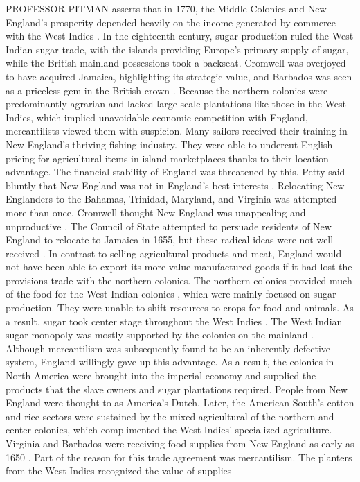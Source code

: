 PROFESSOR PITMAN asserts that in 1770, the Middle Colonies and New England's prosperity depended heavily on the income generated by commerce with the West Indies . In the eighteenth century, sugar production ruled the West Indian sugar trade, with the islands providing Europe's primary supply of sugar, while the British mainland possessions took a backseat. Cromwell was overjoyed to have acquired Jamaica, highlighting its strategic value, and Barbados was seen as a priceless gem in the British crown . Because the northern colonies were predominantly agrarian and lacked large-scale plantations like those in the West Indies, which implied unavoidable economic competition with England, mercantilists viewed them with suspicion. Many sailors received their training in New England's thriving fishing industry. They were able to undercut English pricing for agricultural items in island marketplaces thanks to their location advantage. The financial stability of England was threatened by this. Petty said bluntly that New England was not in England's best interests . Relocating New Englanders to the Bahamas, Trinidad, Maryland, and Virginia was attempted more than once. Cromwell thought New England was unappealing and unproductive . The Council of State attempted to persuade residents of New England to relocate to Jamaica in 1655, but these radical ideas were not well received . In contrast to selling agricultural products and meat, England would not have been able to export its more value manufactured goods if it had lost the provisions trade with the northern colonies. The northern colonies provided much of the food for the West Indian colonies , which were mainly focused on sugar production. They were unable to shift resources to crops for food and animals. As a result, sugar took center stage throughout the West Indies . The West Indian sugar monopoly was mostly supported by the colonies on the mainland . Although mercantilism was subsequently found to be an inherently defective system, England willingly gave up this advantage. As a result, the colonies in North America were brought into the imperial economy and supplied the products that the slave owners and sugar plantations required. People from New England were thought to as America's Dutch. Later, the American South's cotton and rice sectors were sustained by the mixed agricultural of the northern and center colonies, which complimented the West Indies' specialized agriculture. Virginia and Barbados were receiving food supplies from New England as early as 1650 . Part of the reason for this trade agreement was mercantilism. The planters from the West Indies recognized the value of supplies 
